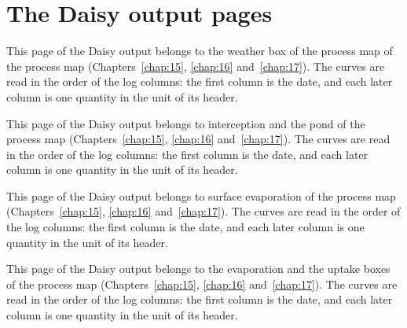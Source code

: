 \section{The Daisy output pages}
\par\vspace{6pt}\noindent{}\par\nobreak
{}\label{fig:a21s_1}
\par\noindent This page of the Daisy output belongs to the weather box of the process map of the process map (Chapters~\ref{chap:15}, \ref{chap:16} and~\ref{chap:17}). The curves are read in the order of the log columns: the first column is the date, and each later column is one quantity in the unit of its header.
\par\vspace{6pt}\noindent{}\par\nobreak
{}\label{fig:a21s_2}
\par\noindent This page of the Daisy output belongs to interception and the pond of the process map (Chapters~\ref{chap:15}, \ref{chap:16} and~\ref{chap:17}). The curves are read in the order of the log columns: the first column is the date, and each later column is one quantity in the unit of its header.
\par\vspace{6pt}\noindent{}\par\nobreak
{}\label{fig:a21s_3}
\par\noindent This page of the Daisy output belongs to surface evaporation of the process map (Chapters~\ref{chap:15}, \ref{chap:16} and~\ref{chap:17}). The curves are read in the order of the log columns: the first column is the date, and each later column is one quantity in the unit of its header.
\par\vspace{6pt}\noindent{}\par\nobreak
{}\label{fig:a21s_4}
\par\noindent This page of the Daisy output belongs to the evaporation and the uptake boxes of the process map (Chapters~\ref{chap:15}, \ref{chap:16} and~\ref{chap:17}). The curves are read in the order of the log columns: the first column is the date, and each later column is one quantity in the unit of its header.
